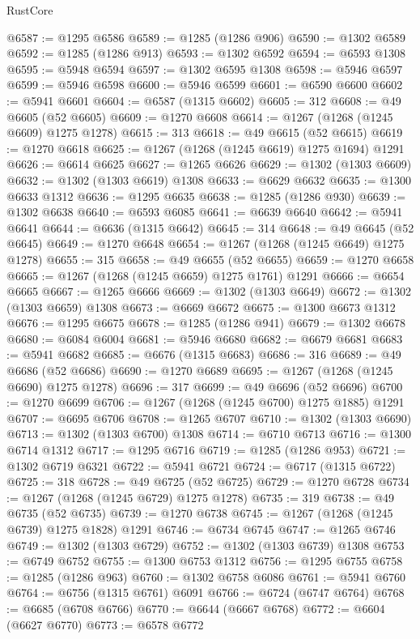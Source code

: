 \begin{lexlean}{RustCore}
\begin{coremodule}
@6587 := @1295 @6586
@6589 := @1285 (@1286 @906)
@6590 := @1302 @6589
@6592 := @1285 (@1286 @913)
@6593 := @1302 @6592
@6594 := @6593 @1308
@6595 := @5948 @6594
@6597 := @1302 @6595 @1308
@6598 := @5946 @6597
@6599 := @5946 @6598
@6600 := @5946 @6599
@6601 := @6590 @6600
@6602 := @5941 @6601
@6604 := @6587 (@1315 @6602)
@6605 := 312
@6608 := @49 @6605 (@52 @6605)
@6609 := @1270 @6608
@6614 := @1267 (@1268 (@1245 @6609) @1275 @1278)
@6615 := 313
@6618 := @49 @6615 (@52 @6615)
@6619 := @1270 @6618
@6625 := @1267 (@1268 (@1245 @6619) @1275 @1694) @1291
@6626 := @6614 @6625
@6627 := @1265 @6626
@6629 := @1302 (@1303 @6609)
@6632 := @1302 (@1303 @6619) @1308
@6633 := @6629 @6632
@6635 := @1300 @6633 @1312
@6636 := @1295 @6635
@6638 := @1285 (@1286 @930)
@6639 := @1302 @6638
@6640 := @6593 @6085
@6641 := @6639 @6640
@6642 := @5941 @6641
@6644 := @6636 (@1315 @6642)
@6645 := 314
@6648 := @49 @6645 (@52 @6645)
@6649 := @1270 @6648
@6654 := @1267 (@1268 (@1245 @6649) @1275 @1278)
@6655 := 315
@6658 := @49 @6655 (@52 @6655)
@6659 := @1270 @6658
@6665 := @1267 (@1268 (@1245 @6659) @1275 @1761) @1291
@6666 := @6654 @6665
@6667 := @1265 @6666
@6669 := @1302 (@1303 @6649)
@6672 := @1302 (@1303 @6659) @1308
@6673 := @6669 @6672
@6675 := @1300 @6673 @1312
@6676 := @1295 @6675
@6678 := @1285 (@1286 @941)
@6679 := @1302 @6678
@6680 := @6084 @6004
@6681 := @5946 @6680
@6682 := @6679 @6681
@6683 := @5941 @6682
@6685 := @6676 (@1315 @6683)
@6686 := 316
@6689 := @49 @6686 (@52 @6686)
@6690 := @1270 @6689
@6695 := @1267 (@1268 (@1245 @6690) @1275 @1278)
@6696 := 317
@6699 := @49 @6696 (@52 @6696)
@6700 := @1270 @6699
@6706 := @1267 (@1268 (@1245 @6700) @1275 @1885) @1291
@6707 := @6695 @6706
@6708 := @1265 @6707
@6710 := @1302 (@1303 @6690)
@6713 := @1302 (@1303 @6700) @1308
@6714 := @6710 @6713
@6716 := @1300 @6714 @1312
@6717 := @1295 @6716
@6719 := @1285 (@1286 @953)
@6721 := @1302 @6719 @6321
@6722 := @5941 @6721
@6724 := @6717 (@1315 @6722)
@6725 := 318
@6728 := @49 @6725 (@52 @6725)
@6729 := @1270 @6728
@6734 := @1267 (@1268 (@1245 @6729) @1275 @1278)
@6735 := 319
@6738 := @49 @6735 (@52 @6735)
@6739 := @1270 @6738
@6745 := @1267 (@1268 (@1245 @6739) @1275 @1828) @1291
@6746 := @6734 @6745
@6747 := @1265 @6746
@6749 := @1302 (@1303 @6729)
@6752 := @1302 (@1303 @6739) @1308
@6753 := @6749 @6752
@6755 := @1300 @6753 @1312
@6756 := @1295 @6755
@6758 := @1285 (@1286 @963)
@6760 := @1302 @6758 @6086
@6761 := @5941 @6760
@6764 := @6756 (@1315 @6761) @6091
@6766 := @6724 (@6747 @6764)
@6768 := @6685 (@6708 @6766)
@6770 := @6644 (@6667 @6768)
@6772 := @6604 (@6627 @6770)
@6773 := @6578 @6772

\end{coremodule}
\end{lexlean}
